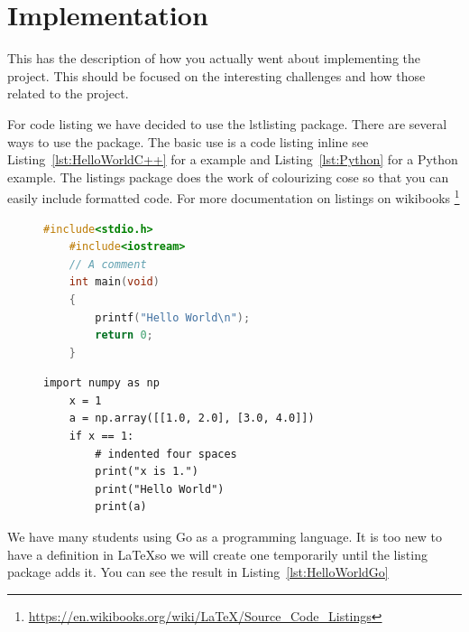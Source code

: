 \chapter{Implementation}
\label{chap:implementation}
This has the description of how you actually went about implementing the project.  This should be focused on the interesting challenges and how those related to the project.



For code listing we have decided to use the lstlisting package. There are several ways to use the package.  The basic use is a code listing inline see Listing~\ref{lst:HelloWorldC++} for a \CPP example and Listing~\ref{lst:Python} for a Python example. The listings package does the work of colourizing cose so that you can easily include formatted code.   For more documentation on listings on wikibooks \footnote{\url{https://en.wikibooks.org/wiki/LaTeX/Source_Code_Listings}}

\lstset{frameround=tttt}
\lstset{frame=single}
\lstset{xleftmargin=.05\textwidth, xrightmargin=.05\textwidth}



\begin{figure}
\begin{lstlisting}[language=C++, caption= {Hello World C++ The code listing for Hello World in C++, with colour syntax highlighting.}, label={lst:HelloWorldC++}]
    #include<stdio.h>
    #include<iostream>
    // A comment
    int main(void)
    {
        printf("Hello World\n");
        return 0;
    }
\end{lstlisting}
\end{figure}

\begin{figure}
\lstset{language=Python}
\begin{lstlisting}[caption = {The code listing for a Python increment a matrix example}, label={lst:Python}]
    import numpy as np
    x = 1
    a = np.array([[1.0, 2.0], [3.0, 4.0]])
    if x == 1:
        # indented four spaces
        print("x is 1.")
        print("Hello World")
        print(a)
\end{lstlisting}
\end{figure}


We have many students using Go as a programming language.  It is too new to have a definition in \LaTeX so we will create one temporarily until the listing package adds it. You can see the result in Listing~\ref{lst:HelloWorldGo}

